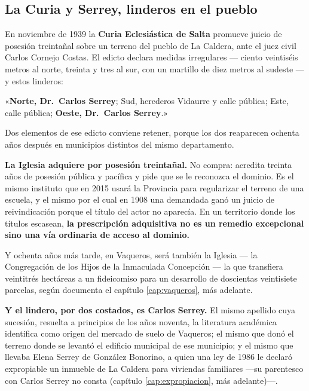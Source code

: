 \subsection*{La Curia y Serrey, linderos en el pueblo}

En noviembre de 1939 la \textbf{Curia Eclesiástica de Salta} promueve juicio de posesión
treintañal sobre un terreno del pueblo de La Caldera, ante el juez civil Carlos Cornejo
Costas. El edicto declara medidas irregulares --- ciento veintiséis metros al norte,
treinta y tres al sur, con un martillo de diez metros al sudeste --- y estos linderos:

«\textbf{Norte, Dr.\ Carlos Serrey}; Sud, herederos Vidaurre y calle pública; Este, calle
pública; \textbf{Oeste, Dr.\ Carlos Serrey}.»

Dos elementos de ese edicto conviene retener, porque los dos reaparecen ochenta años
después en municipios distintos del mismo departamento.

\textbf{La Iglesia adquiere por posesión treintañal.} No compra: acredita treinta años de
posesión pública y pacífica y pide que se le reconozca el dominio. Es el mismo instituto
que en 2015 usará la Provincia para regularizar el terreno de una escuela, y el mismo por el
cual en 1908 una demandada ganó un juicio de reivindicación porque el título del actor no
aparecía. En un territorio donde los títulos escasean, \textbf{la prescripción adquisitiva
no es un remedio excepcional sino una vía ordinaria de acceso al dominio.}

Y ochenta años más tarde, en Vaqueros, será también la Iglesia --- la Congregación de los
Hijos de la Inmaculada Concepción --- la que transfiera veintitrés hectáreas a un
fideicomiso para un desarrollo de doscientas veintisiete parcelas, según documenta el
capítulo \ref{cap:vaqueros}, más adelante.

\textbf{Y el lindero, por dos costados, es Carlos Serrey.} El mismo apellido cuya sucesión,
resuelta a principios de los años noventa, la literatura académica identifica como origen
del mercado de suelo de Vaqueros; el mismo que donó el terreno donde se levantó el edificio
municipal de ese municipio; y el mismo que llevaba Elena Serrey de González Bonorino, a
quien una ley de 1986 le declaró expropiable un inmueble de La Caldera para viviendas familiares ---su
parentesco con Carlos Serrey no consta (capítulo \ref{cap:expropiacion}, más adelante)---.

